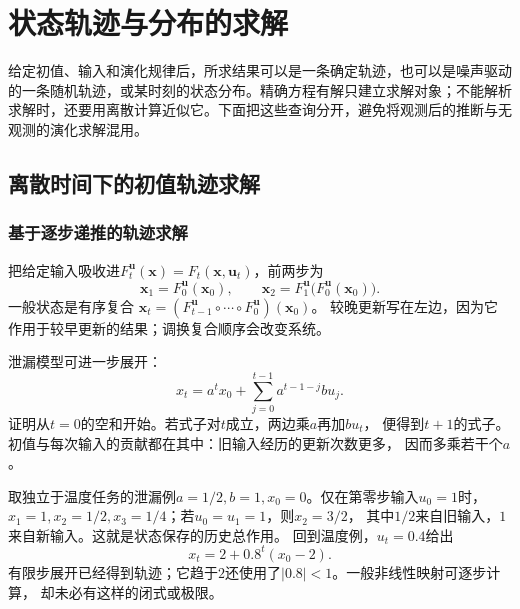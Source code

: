 \section{状态轨迹与分布的求解}
\label{sec:action-state-trajectory-computation}
给定初值、输入和演化规律后，所求结果可以是一条确定轨迹，也可以是噪声驱动的一条随机轨迹，或某时刻的状态分布。精确方程有解只建立求解对象；不能解析求解时，还要用离散计算近似它。下面把这些查询分开，避免将观测后的推断与无观测的演化求解混用。

\subsection{离散时间下的初值轨迹求解}


\subsubsection{基于逐步递推的轨迹求解}
把给定输入吸收进$F_t^{\bm u}(\bm x)=F_t(\bm x,\bm u_t)$，前两步为
\[
  \bm x_1=F_0^{\bm u}(\bm x_0),\qquad
  \bm x_2=F_1^{\bm u}\bigl(F_0^{\bm u}(\bm x_0)\bigr).
\]
一般状态是有序复合
$\bm x_t=(F_{t-1}^{\bm u}\circ\cdots\circ F_0^{\bm u})(\bm x_0)$。
较晚更新写在左边，因为它作用于较早更新的结果；调换复合顺序会改变系统。

泄漏模型可进一步展开：
\begin{equation}
  x_t=a^t x_0+\sum_{j=0}^{t-1}a^{t-1-j}b u_j.
  \label{eq:dynamical-discrete-variation-constants}
\end{equation}
证明从$t=0$的空和开始。若式子对$t$成立，两边乘$a$再加$b u_t$，
便得到$t+1$的式子。初值与每次输入的贡献都在其中：旧输入经历的更新次数更多，
因而多乘若干个$a$。

取独立于温度任务的泄漏例$a=1/2,b=1,x_0=0$。仅在第零步输入$u_0=1$时，
$x_1=1,x_2=1/2,x_3=1/4$；若$u_0=u_1=1$，则$x_2=3/2$，
其中$1/2$来自旧输入，$1$来自新输入。这就是状态保存的历史总作用。
回到温度例，$u_t=0.4$给出
\[
  x_t=2+0.8^t(x_0-2).
\]
有限步展开已经得到轨迹；它趋于$2$还使用了$|0.8|<1$。一般非线性映射可逐步计算，
却未必有这样的闭式或极限。

